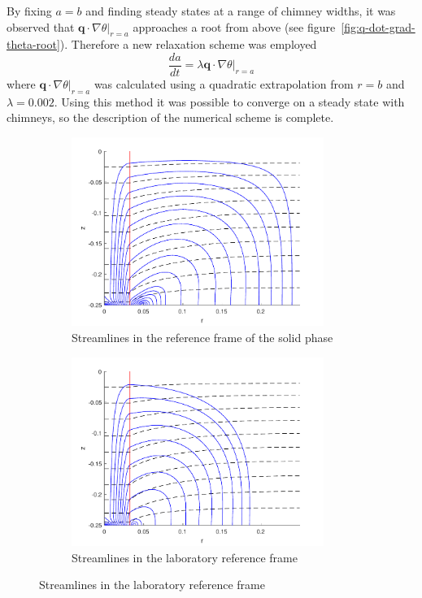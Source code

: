 \documentclass[11pt]{proc}
\begin{document}
By fixing $a=b$ and finding steady states at a range of chimney widths, it was observed that $\left. \mathbf{q} \cdot \nabla \theta \right|_{r=a}$ approaches a root from above (see figure~\ref{fig:q-dot-grad-theta-root}). Therefore a new relaxation scheme was employed
\begin{equation}
\label{eq:relaxation-q-dot-grad-theta}
\frac{da}{dt} = \lambda \left. \mathbf{q} \cdot \nabla \theta \right|_{r=a}
\end{equation}
where $\left. \mathbf{q} \cdot \nabla \theta \right|_{r=a}$ was calculated using a quadratic extrapolation from $r=b$ and $\lambda = 0.002$. Using this method it was possible to converge on a steady state with chimneys, so the description of the numerical scheme is complete.

\begin{figure}[ht!]
\centering
\begin{subfigure}[t]{.48\linewidth}
    \centering
    \includegraphics[width=0.9\textwidth]{steady-state-Rm60H0-25R0-25}
    \caption{Streamlines in the reference frame of the solid phase}
    \label{fig:steady-state-darcy}
 \end{subfigure}
 \quad
 \begin{subfigure}[t]{.48\linewidth}
    \centering
    \includegraphics[width=0.9\textwidth]{steady-state-Rm60H0-25R0-25-q}
    \caption{Streamlines in the laboratory reference frame}
    \label{fig:steady-state-q}
 \end{subfigure}
    

\end{figure}
\end{document}
